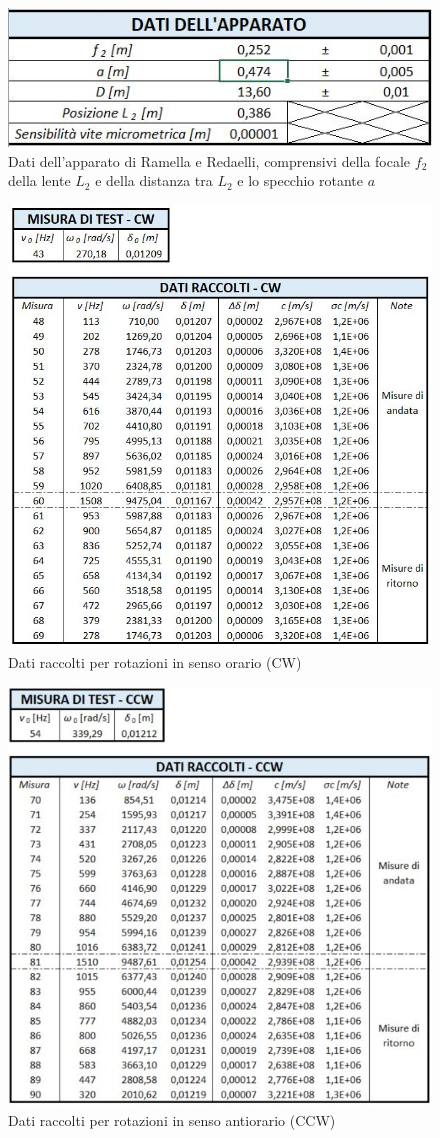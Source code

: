 \documentclass{article}
\begin{document}
\begin{figure}[h!]
    \centering
    \includegraphics[width=0.5\linewidth]{RAM_Apparato.JPG}
    \caption{Dati dell'apparato di Ramella e Redaelli, comprensivi della focale $f_2$ della lente $L_2$ e della distanza tra $L_2$ e lo specchio rotante $a$}
    \label{RAM_Apparato}
\end{figure}

\begin{figure}[h!]
    \centering
    \includegraphics[width=0.6\linewidth]{RAM_CW.JPG}
    \caption{Dati raccolti per rotazioni in senso orario (CW)}
    \label{RAM_CW}
\end{figure}

\begin{figure}[h]
    \centering
    \includegraphics[width=0.6\linewidth]{RAM_CCW.JPG}
    \caption{Dati raccolti per rotazioni in senso antiorario (CCW)}
    \label{RAM_CCW}
\end{figure}
\end{document}
